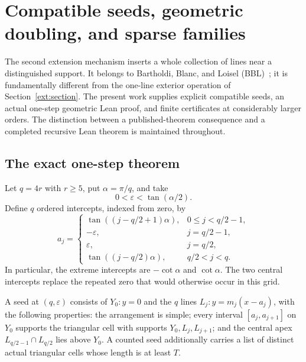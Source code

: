 \section{Compatible seeds, geometric doubling, and sparse families}
\label{fam:section}

The second extension mechanism inserts a whole collection of lines near
a distinguished support.  It belongs to Bartholdi, Blanc, and Loisel
(BBL)~\cite{bbl2008}; it is fundamentally different from the one-line
exterior operation of Section~\ref{ext:section}.  The present work supplies
explicit compatible seeds, an actual one-step geometric Lean proof, and
finite certificates at considerably larger orders.  The distinction
between a published-theorem consequence and a completed recursive Lean
theorem is maintained throughout.

\subsection{The exact one-step theorem}

Let $q=4r$ with $r\geq5$, put $\alpha=\pi/q$, and take
\begin{equation}
  0<\varepsilon<\tan(\alpha/2).
  \label{fam:epsilon}
\end{equation}
Define $q$ ordered intercepts, indexed from zero, by
\begin{equation}
 a_j=
 \begin{cases}
 \tan((j-q/2+1)\alpha),&0\leq j<q/2-1,\\
 -\varepsilon,&j=q/2-1,\\
 \varepsilon,&j=q/2,\\
 \tan((j-q/2)\alpha),&q/2<j<q.
 \end{cases}
 \label{fam:old-grid}
\end{equation}
In particular, the extreme intercepts are $-\cot\alpha$ and
$\cot\alpha$.  The two central intercepts replace the repeated zero that
would otherwise occur in this grid.

\begin{definition}
\label{fam:compatible}
A seed at $(q,\varepsilon)$ consists of $Y_0:y=0$ and the $q$ lines
$L_j:y=m_j(x-a_j)$, with the following properties: the arrangement is
simple; every interval $[a_j,a_{j+1}]$ on $Y_0$ supports the triangular
cell with supports $Y_0,L_j,L_{j+1}$; and the central apex
$L_{q/2-1}\cap L_{q/2}$ lies above $Y_0$.  A counted seed additionally
carries a list of distinct actual triangular cells whose length is at
least $T$.
\end{definition}

